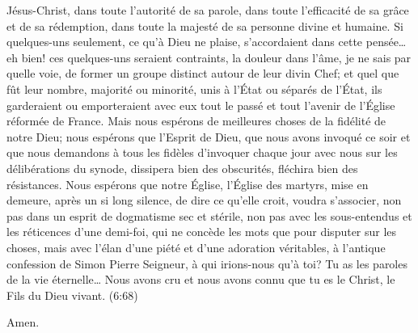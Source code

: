 Jésus-Christ, dans toute l’autorité de sa parole, dans toute l’efficacité de sa grâce et de sa rédemption,
dans toute la majesté de sa personne divine et humaine.
%
Si quelques-uns seulement, ce qu’à Dieu ne plaise, s’accordaient dans cette pensée… eh bien! ces quelques-uns seraient contraints,
la douleur dans l’âme, je ne sais par quelle voie, de former un groupe distinct autour de leur divin Chef;
et quel que fût leur nombre, majorité ou minorité, unis à l’État ou séparés de l’État,
ils garderaient ou emporteraient avec eux tout le passé et tout l’avenir de l’Église réformée de France.
Mais nous espérons de meilleures choses de la fidélité de notre Dieu; nous espérons que l’Esprit de Dieu,
que nous avons invoqué ce soir et que nous demandons à tous les fidèles d’invoquer chaque jour avec nous
sur les délibérations du synode, dissipera bien des obscurités, fléchira bien des résistances.
Nous espérons que notre Église, l’Église des martyrs, mise en demeure, après un si long silence,
de dire ce qu’elle croit, voudra s’associer, non pas dans un esprit de dogmatisme sec et stérile,
non pas avec les sous-entendus et les réticences d’une demi-foi, qui ne concède les mots que pour disputer sur les choses,
mais avec l’élan d’une piété et d’une adoration véritables, à l’antique confession de Simon Pierre\frcolon{}
\Og{} Seigneur, à qui irions-nous qu’à toi? Tu as les paroles de la vie éternelle…
Nous avons cru et nous avons connu que tu es le Christ, le Fils du Dieu vivant. \Fg{}(6:68)

\hfill Amen.


\closechapter

